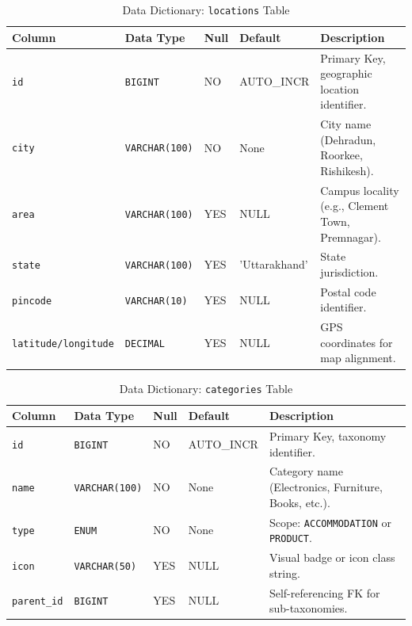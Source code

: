 \begin{table}[htbp]
\centering
\caption{Data Dictionary: \texttt{locations} Table}
\label{tab:dict_locations}
\footnotesize
\begin{tabularx}{\textwidth}{lp{2.5cm}lp{2.0cm}X}
\toprule
\textbf{Column} & \textbf{Data Type} & \textbf{Null} & \textbf{Default} & \textbf{Description} \\
\midrule
\texttt{id} & \texttt{BIGINT} & NO & AUTO\_INCR & Primary Key, geographic location identifier. \\
\texttt{city} & \texttt{VARCHAR(100)} & NO & None & City name (Dehradun, Roorkee, Rishikesh). \\
\texttt{area} & \texttt{VARCHAR(100)} & YES & NULL & Campus locality (e.g., Clement Town, Premnagar). \\
\texttt{state} & \texttt{VARCHAR(100)} & YES & 'Uttarakhand' & State jurisdiction. \\
\texttt{pincode} & \texttt{VARCHAR(10)} & YES & NULL & Postal code identifier. \\
\texttt{latitude/longitude} & \texttt{DECIMAL} & YES & NULL & GPS coordinates for map alignment. \\
\bottomrule
\end{tabularx}
\end{table}

\begin{table}[htbp]
\centering
\caption{Data Dictionary: \texttt{categories} Table}
\label{tab:dict_categories}
\footnotesize
\begin{tabularx}{\textwidth}{lp{2.5cm}lp{2.0cm}X}
\toprule
\textbf{Column} & \textbf{Data Type} & \textbf{Null} & \textbf{Default} & \textbf{Description} \\
\midrule
\texttt{id} & \texttt{BIGINT} & NO & AUTO\_INCR & Primary Key, taxonomy identifier. \\
\texttt{name} & \texttt{VARCHAR(100)} & NO & None & Category name (Electronics, Furniture, Books, etc.). \\
\texttt{type} & \texttt{ENUM} & NO & None & Scope: \texttt{ACCOMMODATION} or \texttt{PRODUCT}. \\
\texttt{icon} & \texttt{VARCHAR(50)} & YES & NULL & Visual badge or icon class string. \\
\texttt{parent\_id} & \texttt{BIGINT} & YES & NULL & Self-referencing FK for sub-taxonomies. \\
\bottomrule
\end{tabularx}
\end{table}

